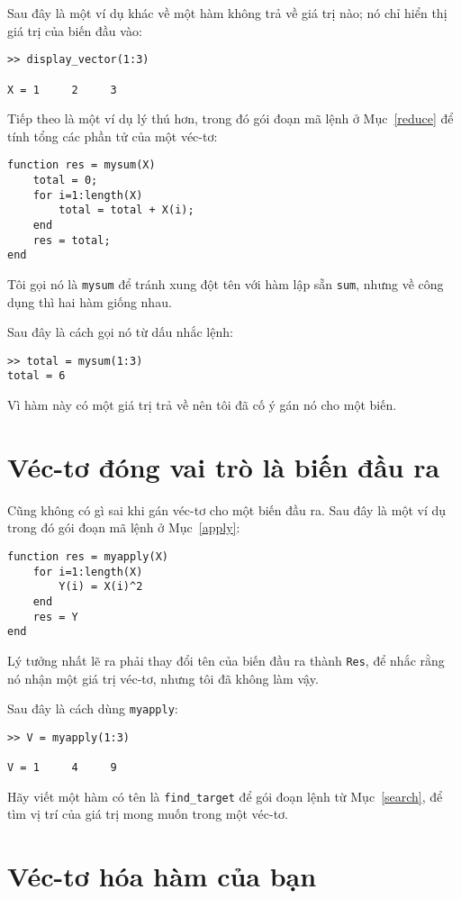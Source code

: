 \documentclass[12pt]{book}
\begin{document}
Sau đây là một ví dụ khác về một hàm không trả về giá trị nào;
nó chỉ hiển thị giá trị của biến đầu vào:

\begin{verbatim}
>> display_vector(1:3)

X = 1     2     3
\end{verbatim}
%
Tiếp theo là một ví dụ lý thú hơn, trong đó gói đoạn mã lệnh ở
Mục~\ref{reduce} để tính tổng các phần tử của một véc-tơ:

\begin{verbatim}
function res = mysum(X)
    total = 0;
    for i=1:length(X)
        total = total + X(i);
    end
    res = total;
end
\end{verbatim}
%
Tôi gọi nó là {\tt mysum} để tránh xung đột tên với hàm lập sẵn
{\tt sum}, nhưng về công dụng thì hai hàm giống nhau.

Sau đây là cách gọi nó từ dấu nhắc lệnh:

\begin{verbatim}
>> total = mysum(1:3)
total = 6
\end{verbatim}
%
Vì hàm này có một giá trị trả về nên tôi đã cố ý gán nó cho một
biến.


\section{Véc-tơ đóng vai trò là biến đầu ra}

Cũng không có gì sai khi gán véc-tơ cho một biến đầu ra. Sau đây
là một ví dụ trong đó gói đoạn mã lệnh ở Mục~\ref{apply}:

\begin{verbatim}
function res = myapply(X)
    for i=1:length(X)
        Y(i) = X(i)^2
    end
    res = Y
end
\end{verbatim}
%
Lý tưởng nhất lẽ ra phải thay đổi tên của biến đầu ra thành
{\tt Res}, để nhắc rằng nó nhận một giá trị véc-tơ, nhưng
tôi đã không làm vậy.

Sau đây là cách dùng {\tt myapply}:

\begin{verbatim}
>> V = myapply(1:3)

V = 1     4     9
\end{verbatim}
%
\begin{ex}
Hãy viết một hàm có tên là \verb#find_target# để gói đoạn lệnh
từ Mục~\ref{search}, để tìm vị trí của giá trị mong muốn trong
một véc-tơ.
\end{ex}


\section{Véc-tơ hóa hàm của bạn}
\end{document}
